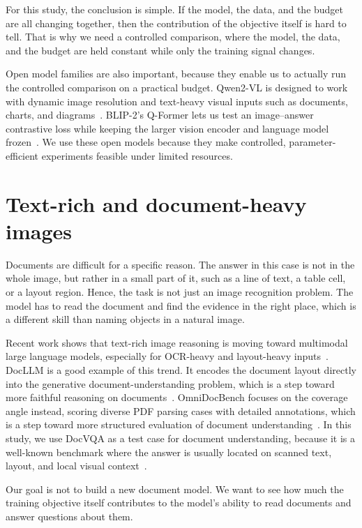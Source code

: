 \documentclass[12pt,bibliography=totoc,listof=totoc,BCOR=5mm,DIV=12,oneside,open=any]{scrbook}
\let\cite\citep
\begin{document}
For this study, the conclusion is simple.
If the model, the data, and the budget are all changing together, then the contribution of the objective itself is hard to tell.
That is why we need a controlled comparison, where the model, the data, and the budget are held constant while only the training signal changes.

Open model families are also important, because they enable us to actually run the controlled comparison on a practical budget.
Qwen2-VL is designed to work with dynamic image resolution and text-heavy visual inputs such as documents, charts, and diagrams~\cite{wang2024qwen2vl}.
BLIP-2's Q-Former lets us test an image--answer contrastive loss while keeping the larger vision encoder and language model frozen~\cite{li2023blip2}.
We use these open models because they make controlled, parameter-efficient experiments feasible under limited resources.

\section{Text-rich and document-heavy images}
Documents are difficult for a specific reason.
The answer in this case is not in the whole image, but rather in a small part of it, such as a line of text, a table cell, or a layout region.
Hence, the task is not just an image recognition problem.
The model has to read the document and find the evidence in the right place, which is a different skill than naming objects in a natural image.

Recent work shows that text-rich image reasoning is moving toward multimodal large language models, especially for OCR-heavy and layout-heavy inputs~\cite{fu2025textrichsurvey}.
DocLLM is a good example of this trend. It encodes the document layout directly into the generative document-understanding problem,
which is a step toward more faithful reasoning on documents~\cite{wang2024docllm}.
OmniDocBench focuses on the coverage angle instead, scoring diverse PDF parsing cases with detailed annotations,
which is a step toward more structured evaluation of document understanding~\cite{ouyang2025omnidocbench}.
In this study, we use DocVQA as a test case for document understanding, because it is a well-known benchmark 
where the answer is usually located on scanned text, layout, and local visual context~\cite{mathew2021docvqa}.

Our goal is not to build a new document model.
We want to see how much the training objective itself contributes to the model's ability to read documents and answer questions about them.
\end{document}
